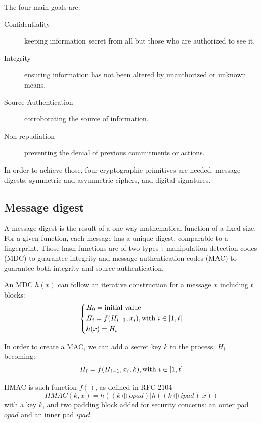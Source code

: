 The four main goals are:
\begin{description}
	\item[Confidentiality] keeping information secret from all but those who are authorized to see it.
	\item[Integrity] ensuring information has not been altered by unauthorized or unknown means.
	\item[Source Authentication] corroborating the source of information.
	\item[Non-repudiation] preventing the denial of previous commitments or actions.
\end{description}

In order to achieve those, four cryptographic primitives are needed: message digests, symmetric and asymmetric ciphers, and digital signatures.








\subsection{Message digest}
A message digest is the result of a one-way mathematical function of a fixed size.
For a given function, each message has a unique digest, comparable to a fingerprint.
Those hash functions are of two types~\cite{infof405}: manipulation detection codes (MDC) to guarantee integrity and message authentication codes (MAC) to guarantee both integrity and source authentication.


An MDC $h(x)$ can follow an iterative construction for a message $x$ including $t$ blocks:
\[
\begin{dcases}
	H_0 = \mbox{initial value}\\
	H_i = f(H_{i-1}, x_i), \mbox{with } i \in [1,t]\\
	h(x) = H_t\\
\end{dcases}
\]

In order to create a MAC, we can add a secret key $k$ to the process, $H_i$ becoming:
\[
	H_i = f(H_{i-1}, x_i, k), \mbox{with } i \in [1,t]\\
\]

HMAC is such function $f()$, as defined in RFC 2104~\cite{rfc2104}
\[
	HMAC(k, x) = h((k\oplus opad)|h((k\oplus ipad)|x))
\]
with a key $k$, and two padding block added for security concerns: an outer pad $opad$ and an inner pad $ipad$.

